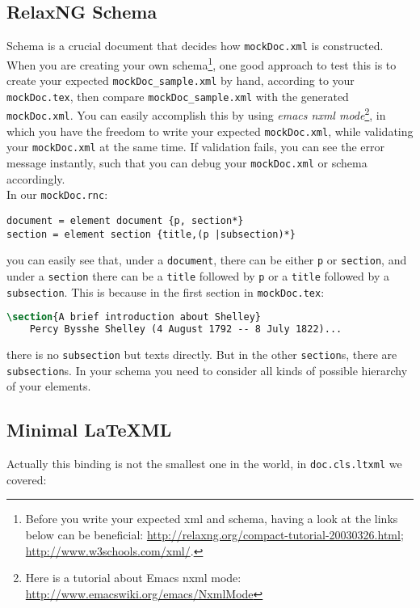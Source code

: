 \documentclass[a4paper]{article}
\begin{document}
\subsection{RelaxNG Schema}
Schema is a crucial document that decides how \texttt{mockDoc.xml} is constructed. When you are creating your own schema\footnote{Before you write your expected xml and schema, having a look at the links below can be beneficial: \url{http://relaxng.org/compact-tutorial-20030326.html}; \url{http://www.w3schools.com/xml/}. }, one good approach to test this is to create your expected \texttt{mockDoc\_sample.xml} by hand, according to your \texttt{mockDoc.tex}, then compare \texttt{mockDoc\_sample.xml} with the generated \texttt{mockDoc.xml}. You can easily accomplish this by using \textit{emacs nxml mode}\footnote{Here is a tutorial about Emacs nxml mode: \url{http://www.emacswiki.org/emacs/NxmlMode}}, in which you have the freedom to write your expected \texttt{mockDoc.xml}, while validating your \texttt{mockDoc.xml} at the same time. If validation fails, you can see the error message instantly, such that you can debug your \texttt{mockDoc.xml} or schema accordingly.\\

 In our \texttt{mockDoc.rnc}:
\begin{lstlisting}
document = element document {p, section*}
section = element section {title,(p |subsection)*}
\end{lstlisting}
you can easily see that, under a \texttt{document}, there can be either \texttt{p} or \texttt{section}, and under a \texttt{section} there can be a \texttt{title} followed by \texttt{p} or a \texttt{title} followed by a \texttt{subsection}. This is because in the first section in \texttt{mockDoc.tex}:
\begin{lstlisting}[language=TeX]
\section{A brief introduction about Shelley}
    Percy Bysshe Shelley (4 August 1792 -- 8 July 1822)...
\end{lstlisting}
there is no \texttt{subsection} but texts directly. But in the other \texttt{section}s, there are \texttt{subsection}s. In your schema you need to consider all kinds of possible hierarchy of your elements.

\subsection{Minimal \LaTeX ML}
Actually this binding is not the smallest one in the world, in \texttt{doc.cls.ltxml} we covered:\\
\end{document}

